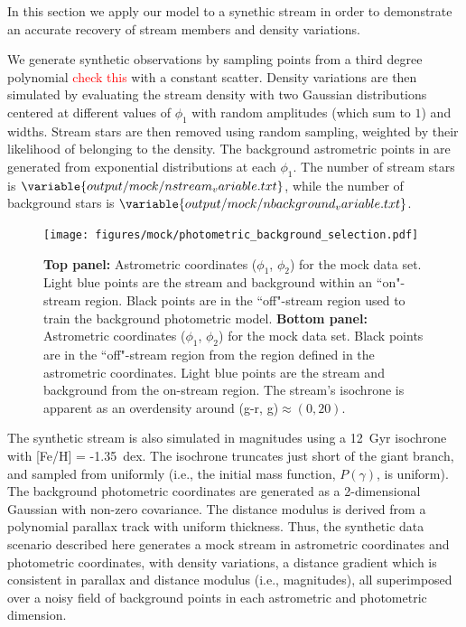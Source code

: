 \documentclass[twocolumn]{aastex631}
\newcommand{\TODO}[1]{{\textcolor{red}{#1}}}
\newcommand{\JN}[1]{\TODO{#1}}
\begin{document}
    In this section we apply our model to a synethic stream in order to demonstrate an accurate recovery of stream members and density variations.

    We generate synthetic observations by sampling points from a third degree polynomial \JN{check this} with a constant scatter. Density variations are then simulated by evaluating the stream density with two Gaussian distributions centered at different values of $\phi_1$ with random amplitudes (which sum to $1$) and widths. Stream stars are then removed using random sampling, weighted by their likelihood of belonging to the density. The background astrometric  points in are generated from exponential distributions at each $\phi_1$. The number of stream stars is $\variable{output/mock/nstream_variable.txt}$, while the number of background stars is $\variable{output/mock/nbackground_variable.txt}$.

    \begin{figure}
        \centering
        \texttt{[image: figures/mock/photometric\_background\_selection.pdf]}
        \caption{
            \textbf{Top panel:} Astrometric coordinates ($\phi_1$, $\phi_2$) for the mock data set.
            Light blue points are the stream and background within an ``on"-stream region. Black points are in the ``off"-stream region used to train the background photometric model.
            \textbf{Bottom panel:} Astrometric coordinates ($\phi_1$, $\phi_2$) for the mock data set.
            Black points are in the ``off"-stream region from the region defined in the astrometric coordinates.
            Light blue points are the stream and background from the on-stream region. The stream's isochrone is apparent as an overdensity around (g-r, g)$\approx (0, 20)$.
        }
        \label{fig:mock_data_photometric_background_selection}
    \end{figure}

    The synthetic stream is also simulated in magnitudes using a 12~Gyr isochrone with [Fe/H] = -1.35~dex. The isochrone truncates just short of the giant branch, and sampled from uniformly (i.e., the initial mass function, $P(\gamma)$, is uniform). The background photometric coordinates are generated as a 2-dimensional Gaussian with non-zero covariance. The distance modulus is derived from a polynomial parallax track with uniform thickness. Thus, the synthetic data scenario described here generates a mock stream in astrometric coordinates and photometric coordinates, with density variations, a distance gradient which is consistent in parallax and distance modulus (i.e., magnitudes), all superimposed over a noisy field of background points in each astrometric and photometric dimension.
\end{document}
